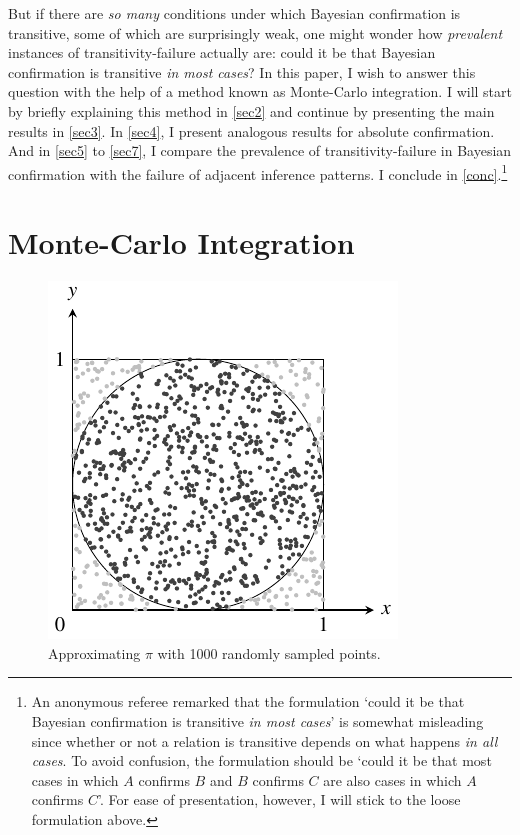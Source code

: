 \documentclass[a4paper,11pt]{article}
\begin{document}
But if there are \emph{so many} conditions under which Bayesian confirmation is transitive, some of which are surprisingly weak, one might wonder how \emph{prevalent} instances of transitivity-failure actually are: could it be that Bayesian confirmation is transitive \emph{in most cases}? In this paper, I wish to answer this question with the help of a method known as Monte-Carlo integration. I will start by briefly explaining this method in \autoref{sec2} and continue by presenting the main results in \autoref{sec3}. In \autoref{sec4}, I present analogous results for absolute confirmation. And in \autoref{sec5} to \ref{sec7}, I compare the prevalence of transitivity-failure in Bayesian confirmation with the failure of adjacent inference patterns. I conclude in \autoref{conc}.\footnote{An anonymous referee remarked that the formulation `could it be that Bayesian confirmation is transitive \emph{in most cases}' is somewhat misleading since whether or not a relation is transitive depends on what happens \emph{in all cases}. To avoid confusion, the formulation should be `could it be that most cases in which $A$ confirms $B$ and $B$ confirms $C$ are also cases in which $A$ confirms $C$'. For ease of presentation, however, I will stick to the loose formulation above.}


\section{Monte-Carlo Integration}
\label{sec2}

\begin{figure}[t]
\centering
\includegraphics[scale=1]{monte.pdf} 
\caption{Approximating $\pi$ with 1000 randomly sampled points.}
\label{pi}
\end{figure}
\end{document}
